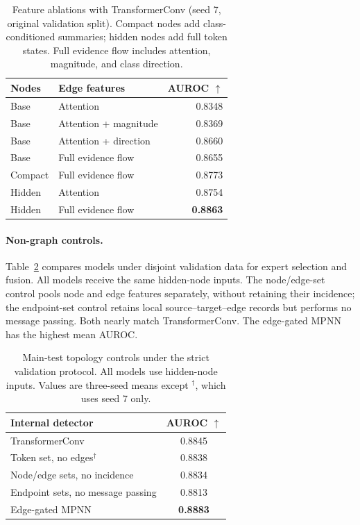 \documentclass[11pt]{article}
\begin{document}
\begin{table}[!htbp]
  \centering
  \small
  \setlength{\tabcolsep}{3pt}
  \renewcommand{\arraystretch}{1.12}
  \begin{tabularx}{\columnwidth}{@{}l>{\raggedright\arraybackslash}Xr@{}}
    \toprule
    Nodes & Edge features & AUROC $\uparrow$ \\
    \midrule
    Base    & Attention             & 0.8348 \\
    Base    & Attention + magnitude & 0.8369 \\
    Base    & Attention + direction & 0.8660 \\
    Base    & Full evidence flow    & 0.8655 \\
    \addlinespace[3pt]
    Compact & Full evidence flow    & 0.8773 \\
    \addlinespace[3pt]
    Hidden  & Attention             & 0.8754 \\
    Hidden  & Full evidence flow    & \textbf{0.8863} \\
    \bottomrule
  \end{tabularx}
  \caption{Feature ablations with TransformerConv (seed 7,
  original validation split). Compact nodes add class-conditioned
  summaries; hidden nodes add full token states. Full evidence
  flow includes attention, magnitude, and class direction.}
  \label{tab:ablations}
\end{table}

\paragraph{Non-graph controls.}
Table~\ref{tab:topology} compares models under disjoint validation data for expert selection and
fusion. All models receive the same hidden-node inputs. The
node/edge-set control pools node and edge features separately,
without retaining their incidence; the endpoint-set control
retains local source--target--edge records but performs no message passing. Both nearly match TransformerConv. The edge-gated MPNN has the highest mean AUROC.

\begin{table}[!htbp]
  \centering
  \small
  \setlength{\tabcolsep}{4pt}
  \renewcommand{\arraystretch}{1.08}
  \begin{tabularx}{\columnwidth}{@{}>{\raggedright\arraybackslash}Xc@{}}
    \toprule
    Internal detector & AUROC $\uparrow$ \\
    \midrule
    TransformerConv                 & 0.8845 \\
    Token set, no edges$^{\dagger}$ & 0.8838 \\
    Node/edge sets, no incidence    & 0.8834 \\
    Endpoint sets, no message passing & 0.8813 \\
    Edge-gated MPNN                 & \textbf{0.8883} \\
    \bottomrule
  \end{tabularx}
  \caption{Main-test topology controls under the strict validation
  protocol. All models use hidden-node inputs. Values are three-seed
  means except $^{\dagger}$, which uses seed 7 only.}
  \label{tab:topology}
\end{table}
\end{document}
